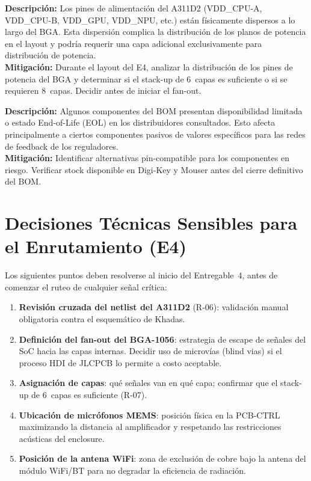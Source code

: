 \begin{riskbox}
  \textbf{Descripción:} Los pines de alimentación del A311D2 (VDD\_CPU-A,
  VDD\_CPU-B, VDD\_GPU, VDD\_NPU, etc.) están físicamente dispersos a lo largo
  del BGA. Esta dispersión complica la distribución de los planos de potencia
  en el layout y podría requerir una capa adicional exclusivamente para
  distribución de potencia.\\
  \textbf{Mitigación:} Durante el layout del E4, analizar la distribución de los
  pines de potencia del BGA y determinar si el stack-up de 6~capas es suficiente
  o si se requieren 8~capas. Decidir antes de iniciar el fan-out.
\end{riskbox}

\begin{riskbox}
  \textbf{Descripción:} Algunos componentes del BOM presentan disponibilidad
  limitada o estado End-of-Life (EOL) en los distribuidores consultados.
  Esto afecta principalmente a ciertos componentes pasivos de valores específicos
  para las redes de feedback de los reguladores.\\
  \textbf{Mitigación:} Identificar alternativas pin-compatible para los componentes
  en riesgo. Verificar stock disponible en Digi-Key y Mouser antes del cierre
  definitivo del BOM.
\end{riskbox}

\section{Decisiones Técnicas Sensibles para el Enrutamiento (E4)}
\label{sec:risk_e4}

Los siguientes puntos deben resolverse al inicio del Entregable~4, antes de
comenzar el ruteo de cualquier señal crítica:

\begin{enumerate}
  \item \textbf{Revisión cruzada del netlist del A311D2} (R-06): validación
    manual obligatoria contra el esquemático de Khadas.
  \item \textbf{Definición del fan-out del BGA-1056}: estrategia de escape de
    señales del SoC hacia las capas internas. Decidir uso de microvías (blind vias)
    si el proceso HDI de JLCPCB lo permite a costo aceptable.
  \item \textbf{Asignación de capas}: qué señales van en qué capa; confirmar
    que el stack-up de 6~capas es suficiente (R-07).
  \item \textbf{Ubicación de micrófonos MEMS}: posición física en la PCB-CTRL
    maximizando la distancia al amplificador y respetando las restricciones
    acústicas del enclosure.
  \item \textbf{Posición de la antena WiFi}: zona de exclusión de cobre bajo
    la antena del módulo WiFi/BT para no degradar la eficiencia de radiación.
\end{enumerate}
